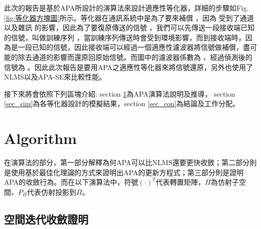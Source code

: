 \documentclass[conference]{IEEEtran}
\begin{document}
    此次的報告是基於APA所設計的演算法來設計適應性等化器，詳細的步驟如Fig.\ref{fig:等化器方塊圖}所示。等化器在通訊系統中是為了要來補償 ，因為 受到了通道以及雜訊 的影響，因此為了要復原傳送的信號  ，我們可以先傳送一段接收端已知的信號，叫做訓練序列  ，當訓練序列傳送時會受到環境影響，而到接收端時，因為是一段已知的信號，因此接收端可以經過一個適應性濾波器將信號做補償，盡可能的除去通道的影響而還原回原始信號。而圖中的濾波器係數為 、經過偵測後的信號為 。因此此次報告是要用APA之適應性等化器來將信號還原，另外也使用了NLMS以及APA-SE來比較性能。
    
    接下來將會依照下列區塊介紹: section \ref{sec_alog}為APA演算法說明及推導，
    section \ref{sec_sim}為各等化器設計的模擬結果，section \ref{sec_con}為結論及工作分配。
    
    \section{Algorithm}\label{sec_alog}
    
    在演算法的部分，第一部分解釋為何APA可以比NLMS還要更快收斂；第二部分則是使用基於最佳化理論的方式來證明出APA的更新方程式；第三部分則是證明APA的收斂行為。而在以下演算法中，符號$(\cdot)^T$代表轉置矩陣，$\Pi$為仿射子空間、$P_{\Pi}$代表仿射投影到$\Pi$。
    
    \subsection{空間迭代收斂證明}
    
\end{document}
